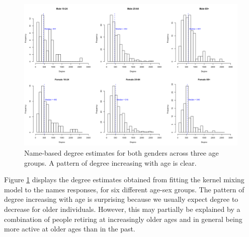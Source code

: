 \begin{figure}
\includegraphics[width=\textwidth]{figures/kernel/names/deg_sexage.png}
\caption{Name-based degree estimates for both genders across three age groups. A pattern of degree increasing with age is clear.}
\label{fig:names_degree_sexage}
\end{figure}

Figure \ref{fig:names_degree_sexage} displays the degree estimates obtained from fitting the kernel mixing model to the names responses, for six different age-sex groups. The pattern of degree increasing with age is surprising because we usually expect degree to decrease for older individuals. However, this may partially be explained by a combination of people retiring at increasingly older ages and in general being more active at older ages than in the past.

